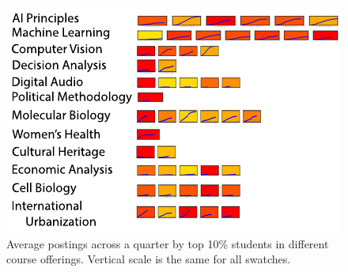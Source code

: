

\begin{figure}[]
       \centering
       \includegraphics[width=1\textwidth]{Figs/smallMultiplesPostings.pdf}
       \caption{\textnormal{Average postings across a quarter by top
           10\% students in different course offerings. Vertical scale
           is the same for all swatches.
       }}
       \label{fig:smallMults}
\end{figure}

